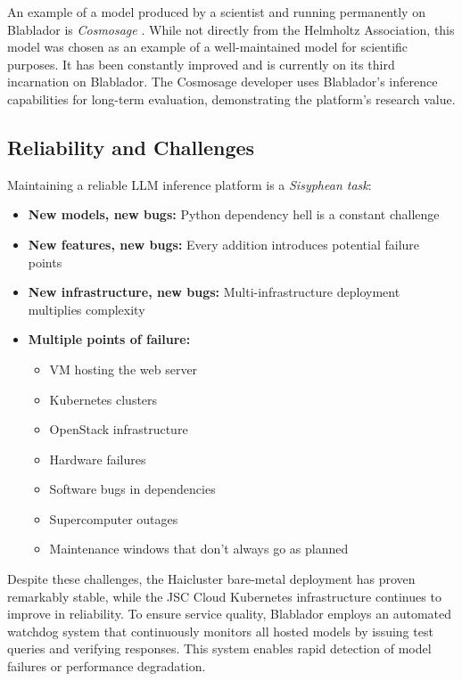 \documentclass[10pt,conference]{IEEEtran}
\begin{document}
An example of a model produced by a scientist and running permanently on Blablador is \emph{Cosmosage} \cite{dehaan2024cosmosage}. While not directly from the Helmholtz Association, this model was chosen as an example of a well-maintained model for scientific purposes. It has been constantly improved and is currently on its third incarnation on Blablador. The Cosmosage developer uses Blablador's inference capabilities for long-term evaluation, demonstrating the platform's research value.

\subsection{Reliability and Challenges}
Maintaining a reliable LLM inference platform is a \emph{Sisyphean task}:

\begin{itemize}
    \item \textbf{New models, new bugs:} Python dependency hell is a constant challenge
    \item \textbf{New features, new bugs:} Every addition introduces potential failure points
    \item \textbf{New infrastructure, new bugs:} Multi-infrastructure deployment multiplies complexity
    
    \item \textbf{Multiple points of failure:}
    \begin{itemize}
        \item VM hosting the web server
        \item Kubernetes clusters
        \item OpenStack infrastructure
        \item Hardware failures
        \item Software bugs in dependencies
        \item Supercomputer outages
        \item Maintenance windows that don't always go as planned
    \end{itemize}
\end{itemize}

Despite these challenges, the Haicluster bare-metal deployment has proven remarkably stable, while the JSC Cloud Kubernetes infrastructure continues to improve in reliability. To ensure service quality, Blablador employs an automated watchdog system \cite{blablador-watchdog} that continuously monitors all hosted models by issuing test queries and verifying responses. This system enables rapid detection of model failures or performance degradation.
\end{document}
